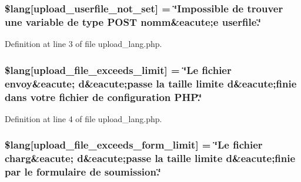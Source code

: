 \subsubsection[{\texorpdfstring{\$lang}{$lang}}]{\setlength{\rightskip}{0pt plus 5cm}\$lang\mbox{[}\textquotesingle{}upload\+\_\+userfile\+\_\+not\+\_\+set\textquotesingle{}\mbox{]} = \char`\"{}Impossible de trouver une variable de {\bf type} P\+O\+ST nomm\&eacute;{\bf e} userfile.\char`\"{}}\hypertarget{application_2language_2french_2upload__lang_8php_a6d12ff4074b1e4c6f22a4a5107fae5ee}{}\label{application_2language_2french_2upload__lang_8php_a6d12ff4074b1e4c6f22a4a5107fae5ee}


Definition at line 3 of file upload\+\_\+lang.\+php.

\subsubsection[{\texorpdfstring{\$lang}{$lang}}]{\setlength{\rightskip}{0pt plus 5cm}\$lang\mbox{[}\textquotesingle{}upload\+\_\+file\+\_\+exceeds\+\_\+limit\textquotesingle{}\mbox{]} = \char`\"{}Le fichier envoy\&eacute; {\bf d}\&eacute;passe la taille limite {\bf d}\&eacute;finie dans votre fichier de configuration P\+H\+P.\char`\"{}}\hypertarget{application_2language_2french_2upload__lang_8php_a9028f049ebbe292a27e0e2b2e5f7d660}{}\label{application_2language_2french_2upload__lang_8php_a9028f049ebbe292a27e0e2b2e5f7d660}


Definition at line 4 of file upload\+\_\+lang.\+php.

\subsubsection[{\texorpdfstring{\$lang}{$lang}}]{\setlength{\rightskip}{0pt plus 5cm}\$lang\mbox{[}\textquotesingle{}upload\+\_\+file\+\_\+exceeds\+\_\+form\+\_\+limit\textquotesingle{}\mbox{]} = \char`\"{}Le fichier charg\&eacute; {\bf d}\&eacute;passe la taille limite {\bf d}\&eacute;finie par le formulaire de soumission.\char`\"{}}\hypertarget{application_2language_2french_2upload__lang_8php_af6f65d563af150d50dfc6957079fd529}{}\label{application_2language_2french_2upload__lang_8php_af6f65d563af150d50dfc6957079fd529}


